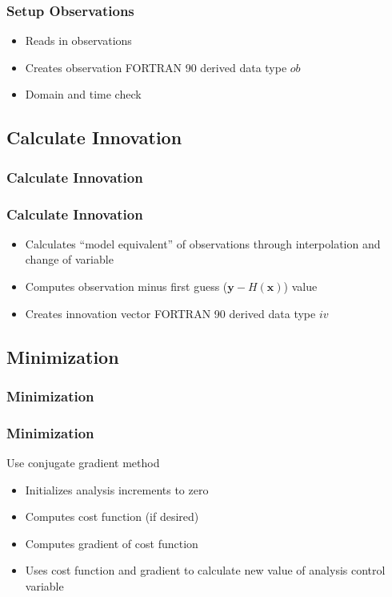 \documentclass{beamer}
\begin{document}
\begin{frame}
\frametitle{Setup Observations}
\begin{itemize}
\item Reads in observations \pause
\item Creates observation FORTRAN 90 derived data type $ob$ \pause
\item Domain and time check
\end{itemize}
\end{frame}

\subsection{Calculate Innovation}
\begin{frame}
\frametitle{Calculate Innovation}
\end{frame}

\begin{frame}
\frametitle{Calculate Innovation}
\begin{itemize}
\item Calculates “model equivalent” of observations through interpolation and change of variable \pause
\item Computes observation minus first guess ($\mathbf{y}-H(\mathbf{x})$) value \pause
\item Creates innovation vector FORTRAN 90 derived data type $iv$
\end{itemize}
\end{frame}

\subsection{Minimization}
\begin{frame}
\frametitle{Minimization}
\end{frame}

\begin{frame}
\frametitle{Minimization}
Use conjugate gradient method \pause
\begin{itemize}
\item Initializes analysis increments to zero \pause
\item Computes cost function (if desired)\pause
\item Computes gradient of cost function \pause
\item Uses cost function and gradient to calculate new value of analysis control variable
\end{itemize}
\end{frame}
\end{document}

